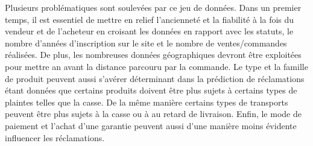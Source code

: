 Plusieurs problématiques sont soulevées par ce jeu de données. Dans un premier temps, 
il est essentiel de mettre en relief l'ancienneté et la fiabilité à la fois du vendeur et 
de l'acheteur en croisant les données en rapport avec les statuts, le nombre d'années 
d'inscription sur le site et le nombre de ventes/commandes réalisées. De plus, les 
nombreuses données géographiques devront être exploitées pour mettre an avant la distance
parcouru par la commande. Le type et la famille de produit peuvent aussi s'avérer déterminant
dans la prédiction de réclamations étant données que certains produits doivent être 
plus sujets à certains types de plaintes telles que la casse. De la même manière certains
types de transports peuvent être plus sujets à la casse ou à au retard de livraison. 
Enfin, le mode de paiement et l'achat d'une garantie peuvent aussi d'une manière moins
évidente influencer les réclamations.



